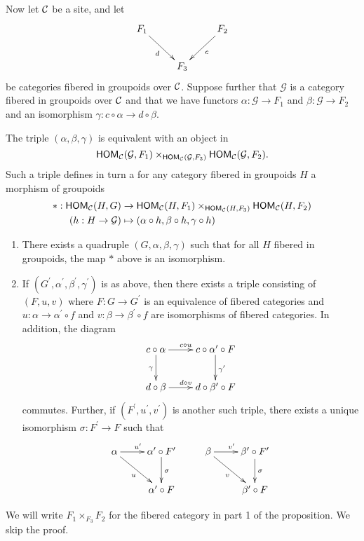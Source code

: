 \documentclass[11pt, english]{article}
\begin{document}
Now let $\mathcal{C}$ be a site, and let
\[
\xymatrix{
F_1 \ar[dr]_d && F_2 \ar[dl]^c \\
 & F_3
}
\]
be categories fibered in groupoids over $\mathcal{C}$. Suppose further that $\mathcal G$ is a category fibered in groupoids over $\mathcal{C}$ and that we have functors $\alpha:\mathcal G \to F_1$ and $\beta:\mathcal G \to F_2$ and an isomorphism $\gamma:c \circ \alpha \to d \circ \beta$. 

The triple $(\alpha,\beta,\gamma)$ is equivalent with an object in
\[
\operatorname{\mathsf{HOM}}_{\mathcal{C}}(\mathcal G, F_1) \times_{\operatorname{\mathsf{HOM}}_{\mathcal{C}}(\mathcal G, F_3)} \operatorname{\mathsf{HOM}}_{\mathcal{C}}(\mathcal G, F_2).
\]
Such a triple defines in turn a for any category fibered in groupoids $ H$ a morphism of groupoids
\begin{align*}
\ast: \operatorname{\mathsf{HOM}}_{\mathcal{C}}(H,G) &\to \operatorname{\mathsf{HOM}}_{\mathcal{C}}(H,F_1) \times_{\operatorname{\mathsf{HOM}}_{\mathcal{C}}(H,F_3)} \operatorname{\mathsf{HOM}}_{\mathcal{C}}(H,F_2) \\
(h:H \to \mathcal G) &\mapsto (\alpha \circ h, \beta \circ h, \gamma \circ h)
\end{align*}

\begin{prop}
\begin{enumerate}
\item There exists a quadruple $(G,\alpha,\beta,\gamma)$ such that for all $H$ fibered in groupoids, the map $\ast$ above is an isomorphism.
\item If $(G^{\prime}, \alpha^\prime, \beta^\prime, \gamma^\prime)$ is as above, then there exists a triple consisting of $(F,u,v)$ where $F:G \to G^\prime$ is an equivalence of fibered categories and $u:\alpha \to \alpha^\prime \circ f$ and $v:\beta \to \beta^\prime \circ f$ are isomorphisms of fibered categories. In addition, the diagram
\[
\xymatrix{
c \circ \alpha \ar[r]^{c \circ u} \ar[d]_\gamma &  c \circ \alpha^\prime \circ F \ar[d]^{\gamma^\prime} \\
d \circ \beta \ar[r]^{d \circ v} & d \circ \beta^\prime \circ F
}
\]
commutes. Further, if $(F^\prime,u^\prime,v^\prime)$ is another such triple, there exists a unique isomorphism $\sigma:F^\prime \to F$ such that
\[
\xymatrix{
\alpha \ar[r]^{u^\prime} \ar[dr]_u & \alpha^\prime \circ F^\prime \ar[d]^\sigma & \beta \ar[r]^{v^\prime} \ar[dr]_{v} & \beta^\prime \circ F^\prime \ar[d]^\sigma \\
& \alpha^\prime \circ F && \beta^\prime \circ F
}
\]
\end{enumerate}
\end{prop}
We will write $F_1 \times_{F_3} F_2$ for the fibered category in part 1 of the proposition. We skip the proof.
\end{document}
